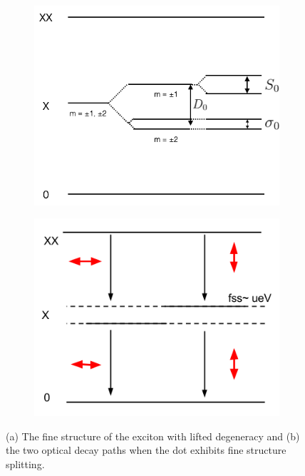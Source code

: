\documentclass[12pt, twoside]{article}
\numberwithin{equation}{section}
\begin{document}
\begin{figure}[h!]
\centering
\begin{subfigure}{.5\textwidth}
  \centering
  \includegraphics[width=0.9\linewidth]{images/finestructurewithfss.png}
  \caption{}
  \label{fig:sub1}
\end{subfigure}%
\begin{subfigure}{.5\textwidth}
  \centering
  \includegraphics[width=0.9\linewidth]{images/decaypathswithfss.png}
  \caption{}
  \label{fig:decaywithfss}
\end{subfigure}
\caption{(a) The fine structure of the exciton with lifted degeneracy and (b) the two optical decay paths when the dot exhibits fine structure splitting.}
\label{fig:withfss}
\end{figure}
\end{document}
